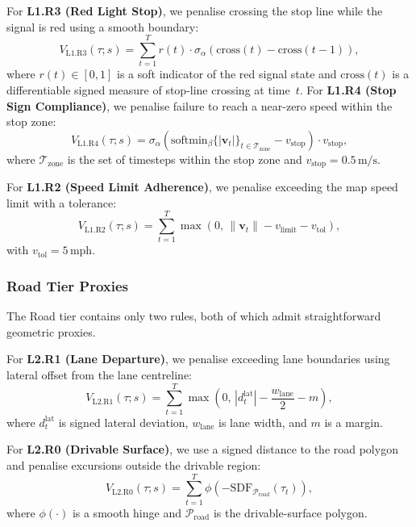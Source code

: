 For \textbf{L1.R3 (Red Light Stop)}, we penalise crossing the stop line while the signal is red using a smooth boundary:
\begin{equation}
V_{\text{L1.R3}}(\tau; s)=\sum_{t=1}^{T} r(t) \cdot \sigma_\alpha\!\left(\mathrm{cross}(t)-\mathrm{cross}(t{-}1)\right),
\end{equation}
where $r(t)\in[0,1]$ is a soft indicator of the red signal state and $\mathrm{cross}(t)$ is a differentiable signed measure of stop-line crossing at time~$t$. 
For \textbf{L1.R4 (Stop Sign Compliance)}, we penalise failure to reach a near-zero speed within the stop zone:
\begin{equation}
V_{\text{L1.R4}}(\tau; s)=\sigma_\alpha\!\left(\text{softmin}_\beta\{|\mathbf{v}_t|\}_{t\in\mathcal{T}_{\text{zone}}}-v_{\text{stop}}\right) \cdot v_{\text{stop}},
\end{equation}
where $\mathcal{T}_{\text{zone}}$ is the set of timesteps within the stop zone and $v_{\text{stop}}{=}0.5\,\mathrm{m/s}$.

For \textbf{L1.R2 (Speed Limit Adherence)}, we penalise exceeding the map speed limit with a tolerance:
\begin{equation}
V_{\text{L1.R2}}(\tau; s)=\sum_{t=1}^{T}\max\!\left(0,\,\|\mathbf{v}_t\|-v_{\text{limit}}-v_{\text{tol}}\right),
\end{equation}
with $v_{\text{tol}}{=}5$\,mph.

\subsubsection{Road Tier Proxies}

The Road tier contains only two rules, both of which admit straightforward geometric proxies.

For \textbf{L2.R1 (Lane Departure)}, we penalise exceeding lane boundaries using lateral offset from the lane centreline: 
\begin{equation} 
    V_{\text{L2.R1}}(\tau; s)=\sum_{t=1}^{T}\max\!\left(0,\,|d_t^{\text{lat}}|-\frac{w_{\text{lane}}}{2}-m\right),
\end{equation}
where $d_t^{\text{lat}}$ is signed lateral deviation, $w_{\text{lane}}$ is lane width, and $m$ is a margin.

For \textbf{L2.R0 (Drivable Surface)}, we use a signed distance to the road polygon and penalise excursions outside the drivable region:
\begin{equation}
V_{\text{L2.R0}}(\tau; s)=\sum_{t=1}^{T}\phi\!\left(-\mathrm{SDF}_{\mathcal{P}_{\text{road}}}(\tau_t)\right),
\end{equation}
where $\phi(\cdot)$ is a smooth hinge and $\mathcal{P}_{\text{road}}$ is the drivable-surface polygon.

